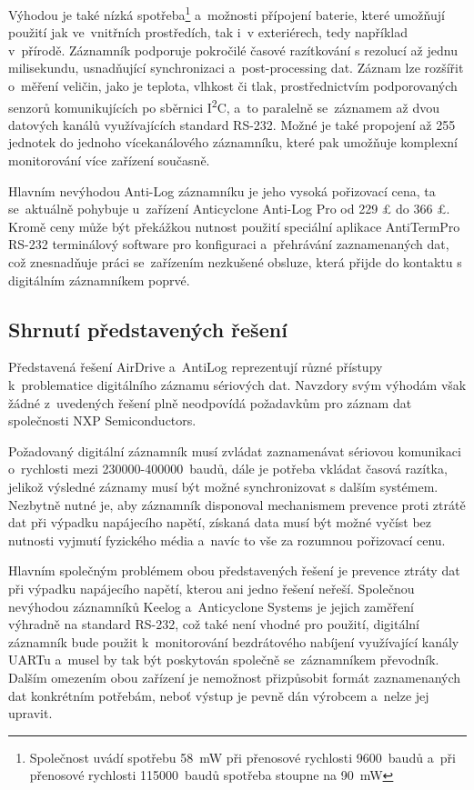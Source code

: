 Výhodou je také nízká spotřeba\footnote{Společnost uvádí spotřebu \SI{58}{\milli\watt} při přenosové rychlosti 9600~baudů a~při přenosové rychlosti 115000~baudů spotřeba stoupne na \SI{90}{\milli\watt}} a~možnosti přípojení baterie, které umožňují použití jak ve~vnitřních prostředích, tak i~v exteriérech, tedy například v~přírodě. Záznamník podporuje pokročilé časové razítkování s rezolucí až jednu milisekundu, usnadňující synchronizaci a~post-processing dat. Záznam lze rozšířit o~měření veličin, jako je teplota, vlhkost či tlak, prostřednictvím podporovaných senzorů komunikujících po sběrnici I\textsuperscript{2}C, a~to paralelně se~záznamem až dvou datových kanálů využívajících standard RS-232. Možné je také propojení až 255 jednotek do jednoho vícekanálového záznamníku, které pak umožňuje komplexní monitorování více zařízení současně.~\cite{anticyclone_systems_antilog_pro}

Hlavním nevýhodou Anti-Log záznamníku je jeho vysoká pořizovací cena, ta se~aktuálně pohybuje u~zařízení Anticyclone Anti-Log Pro od 229 £ do 366 £. Kromě ceny může být překážkou nutnost použití speciální aplikace AntiTermPro RS-232 terminálový software pro konfiguraci a~přehrávání zaznamenaných dat, což znesnadňuje práci se~zařízením nezkušené obsluze, která přijde do kontaktu s digitálním záznamníkem poprvé.~\cite{anticyclone_systems_antilog_pro}

\subsection{Shrnutí představených řešení}

Představená řešení AirDrive a~AntiLog reprezentují různé přístupy k~problematice digitálního záznamu sériových dat. Navzdory svým výhodám však žádné z~uvedených řešení plně neodpovídá požadavkům pro záznam dat společnosti NXP Semiconductors. 

Požadovaný digitální záznamník musí zvládat zaznamenávat sériovou komunikaci o~rychlosti mezi 230000-400000~baudů, dále je potřeba vkládat časová razítka, jelikož výsledné záznamy musí být možné synchronizovat s dalším systémem. Nezbytně nutné je, aby záznamník disponoval mechanismem prevence proti ztrátě dat při výpadku napájecího napětí, získaná data musí být možné vyčíst bez nutnosti vyjmutí fyzického média a~navíc to vše za rozumnou pořizovací cenu.

Hlavním společným problémem obou představených řešení je prevence ztráty dat při výpadku napájecího napětí, kterou ani jedno řešení neřeší. Společnou nevýhodou záznamníků Keelog a~Anticyclone Systems je jejich zaměření výhradně na standard RS-232, což také není vhodné pro použití, digitální záznamník bude použit k~monitorování bezdrátového nabíjení využívající kanály UARTu a~musel by tak být poskytován společně se~záznamníkem převodník. Dalším omezením obou zařízení je nemožnost přizpůsobit formát zaznamenaných dat konkrétním potřebám, neboť výstup je pevně dán výrobcem a~nelze jej upravit.

